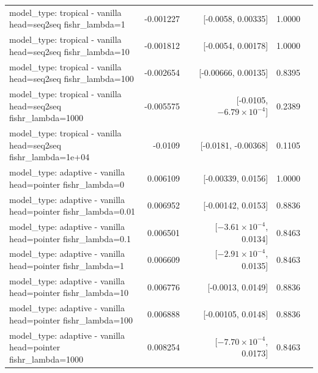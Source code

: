 \documentclass[10pt]{article}
\makeatletter
\newcommand{\stackcell}[1]{\begin{tabular}[t]{@{}l@{}}#1\end{tabular}}
\makeatother
\begin{document}
{\begin{longtable}{lrrrl}
\stackcell{model\_type: tropical - vanilla\\\footnotesize head=seq2seq fishr\_lambda=1 } & -0.001227 & [-0.0058, 0.00335] & 1.0000 & \\
\stackcell{model\_type: tropical - vanilla\\\footnotesize head=seq2seq fishr\_lambda=10 } & -0.001812 & [-0.0054, 0.00178] & 1.0000 & \\
\stackcell{model\_type: tropical - vanilla\\\footnotesize head=seq2seq fishr\_lambda=100 } & -0.002654 & [-0.00666, 0.00135] & 0.8395 & \\
\stackcell{model\_type: tropical - vanilla\\\footnotesize head=seq2seq fishr\_lambda=1000 } & -0.005575 & [-0.0105, $-6.79\times10^{-4}$] & 0.2389 & \\
\stackcell{model\_type: tropical - vanilla\\\footnotesize head=seq2seq fishr\_lambda=1e+04 } & -0.0109 & [-0.0181, -0.00368] & 0.1105 & \\
\stackcell{model\_type: adaptive - vanilla\\\footnotesize head=pointer fishr\_lambda=0 } & 0.006109 & [-0.00339, 0.0156] & 1.0000 & \\
\stackcell{model\_type: adaptive - vanilla\\\footnotesize head=pointer fishr\_lambda=0.01 } & 0.006952 & [-0.00142, 0.0153] & 0.8836 & \\
\stackcell{model\_type: adaptive - vanilla\\\footnotesize head=pointer fishr\_lambda=0.1 } & 0.006501 & [$-3.61\times10^{-4}$, 0.0134] & 0.8463 & \\
\stackcell{model\_type: adaptive - vanilla\\\footnotesize head=pointer fishr\_lambda=1 } & 0.006609 & [$-2.91\times10^{-4}$, 0.0135] & 0.8463 & \\
\stackcell{model\_type: adaptive - vanilla\\\footnotesize head=pointer fishr\_lambda=10 } & 0.006776 & [-0.0013, 0.0149] & 0.8836 & \\
\stackcell{model\_type: adaptive - vanilla\\\footnotesize head=pointer fishr\_lambda=100 } & 0.006888 & [-0.00105, 0.0148] & 0.8836 & \\
\stackcell{model\_type: adaptive - vanilla\\\footnotesize head=pointer fishr\_lambda=1000 } & 0.008254 & [$-7.70\times10^{-4}$, 0.0173] & 0.8463 & \\

\end{longtable}}
\end{document}
